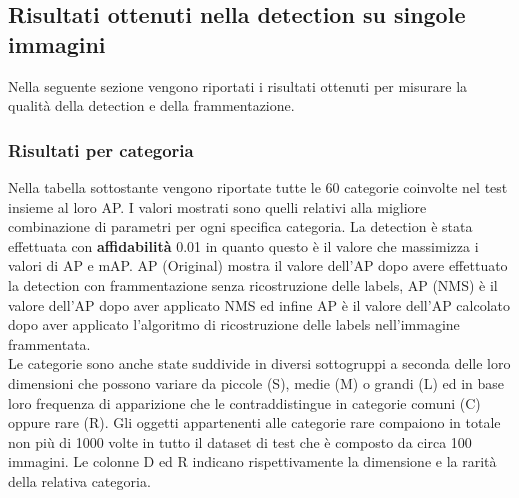 \subsection{Risultati ottenuti nella detection su singole immagini}
Nella seguente sezione vengono riportati i risultati ottenuti per misurare la qualità della detection e della frammentazione.
\subsubsection{Risultati per categoria}
Nella tabella sottostante vengono riportate tutte le 60 categorie coinvolte nel test insieme al loro AP. I valori mostrati sono quelli relativi alla migliore combinazione di parametri per ogni specifica categoria. La detection è stata effettuata con \textbf{affidabilità} 0.01 in quanto questo è il valore che massimizza i valori di AP e mAP. AP (Original) mostra il valore dell'AP dopo avere effettuato la detection con frammentazione senza ricostruzione delle labels, AP (NMS) è il valore dell'AP dopo aver applicato NMS ed infine AP è il valore dell'AP calcolato dopo aver applicato l'algoritmo di ricostruzione delle labels nell'immagine frammentata.\\
Le categorie sono anche state suddivide in diversi sottogruppi a seconda delle loro dimensioni che possono variare da piccole (S), medie (M) o grandi (L) ed in base loro frequenza di apparizione che le contraddistingue in categorie comuni (C) oppure rare (R). Gli oggetti appartenenti alle categorie rare compaiono in totale non più di 1000 volte in tutto il dataset di test che è composto da circa 100 immagini. Le colonne D ed R indicano rispettivamente la dimensione e la rarità della relativa categoria.

